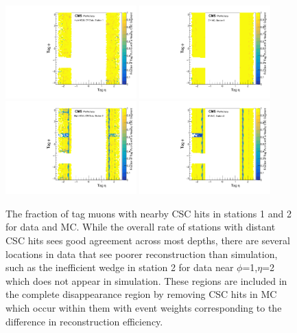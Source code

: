 \begin{figure}[htbp]
    \includegraphics[width=0.45\textwidth]{figures/cscNearbyFracData_station0.pdf}
    \hspace{0.01\textwidth}
    \centering
    \includegraphics[width=0.45\textwidth]{figures/cscNearbyFracMC_station0.pdf}
    \includegraphics[width=0.45\textwidth]{figures/cscNearbyFracData_station1.pdf}
    \hspace{0.01\textwidth}
    \includegraphics[width=0.45\textwidth]{figures/cscNearbyFracMC_station1.pdf}
	\caption[CSC segment efficiencies for stations 1 and 2]{The fraction of tag muons with nearby CSC hits in stations 1 and 2 for data and MC. While the overall rate of stations with distant CSC hits sees good agreement across most depths, there are several locations in data that see poorer reconstruction than simulation, such as the inefficient wedge in station 2 for data near $\phi$=1,$\eta$=2 which does not appear in simulation. These regions are included in the complete disappearance region by removing CSC hits in MC which occur within them with event weights corresponding to the difference in reconstruction efficiency.}
    \label{fig:CSCeff}

\end{figure}
